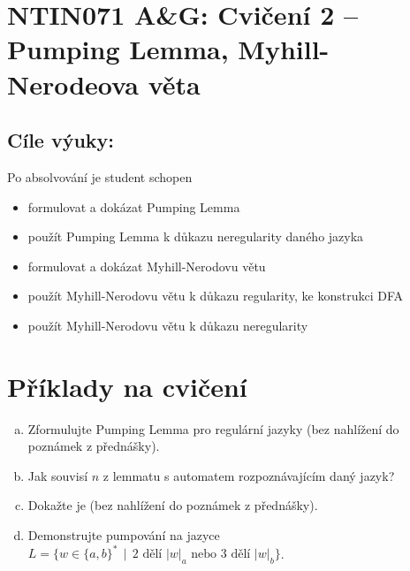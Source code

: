 \documentclass[a4paper,12pt]{amsart}
\begin{document}
\thispagestyle{empty}

\section*{NTIN071 A\&G: Cvičení 2 -- Pumping Lemma, Myhill-Nerodeova věta}

\subsection*{Cíle výuky:} Po absolvování je student schopen

\begin{itemize}\setlength{\itemsep}{0pt}
    \item formulovat a dokázat Pumping Lemma
    \item použít Pumping Lemma k důkazu neregularity daného jazyka
    \item formulovat a dokázat Myhill-Nerodovu větu
    \item použít Myhill-Nerodovu větu k důkazu regularity, ke konstrukci DFA
    \item použít Myhill-Nerodovu větu k důkazu neregularity
\end{itemize}


\section*{Příklady na cvičení}


\medskip\begin{problem}

    \begin{enumerate}[(a)]\setlength\itemsep{6pt}
        \item Zformulujte Pumping Lemma pro regulární jazyky (bez nahlížení do poznámek z přednášky).
        \item Jak souvisí $n$ z lemmatu s automatem rozpoznávajícím daný jazyk?
        \item Dokažte je (bez nahlížení do poznámek z přednášky).
        \item Demonstrujte pumpování na jazyce $L=\{w\in\{a,b\}^* \,\mid\,\text{2 dělí $|w|_a$ nebo 3 dělí $|w|_b$}\}$.
    \end{enumerate}

\end{problem}
\end{document}
